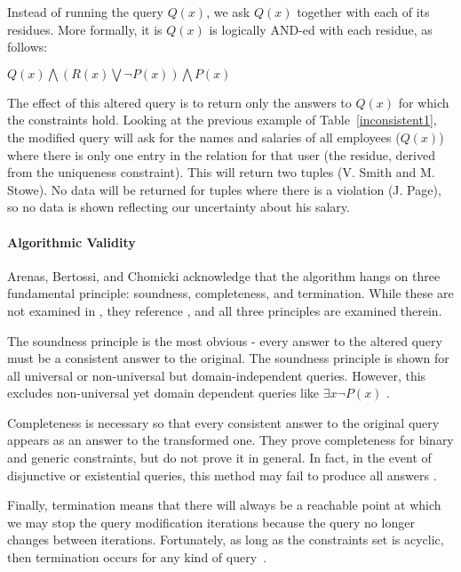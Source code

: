 \documentclass[a4paper]{report}
\begin{document}
Instead of running the query $Q(x)$, we ask $Q(x)$ together with each of its residues. More formally, it is $Q(x)$ is logically AND-ed with each residue, as follows:

\begin{center}
$Q(x) \bigwedge (R(x) \bigvee \neg P(x)) \bigwedge P(x)$
\end{center}

The effect of this altered query is to return only the answers to $Q(x)$ for which the constraints hold. Looking at the previous example of Table~\ref{inconsistent1}, the modified query will ask for the names and salaries of all employees ($Q(x)$) where there is only one entry in the relation for that user (the residue, derived from the uniqueness constraint). This will return two tuples (V. Smith and M. Stowe). No data will be returned for tuples where there is a violation (J. Page), so no data is shown reflecting our uncertainty about his salary.

\paragraph{Algorithmic Validity} Arenas, Bertossi, and Chomicki acknowledge that the algorithm hangs on three fundamental principle: soundness, completeness, and termination. While these are not examined in \cite{CQ}, they reference \cite{CQI}, and all three principles are examined therein.

The soundness principle is the most obvious - every answer to the altered query must be a consistent answer to the original. The soundness principle is shown for all universal or non-universal but domain-independent queries. However, this excludes non-universal yet domain dependent queries like $\exists x \neg P(x)$ \cite{CQI}.

Completeness is necessary so that every consistent answer to the original query appears as an answer to the transformed one. They prove completeness for binary and generic constraints, but do not prove it in general. In fact, in the event of disjunctive or existential queries, this method may fail to produce all answers \cite{CQ}. 

Finally, termination means that there will always be a reachable point at which we may stop the query modification iterations because the query no longer changes between iterations. Fortunately, as long as the constraints set is acyclic, then termination occurs for any kind of  query~\cite{CQI}\cite{CQ}.
\end{document}
